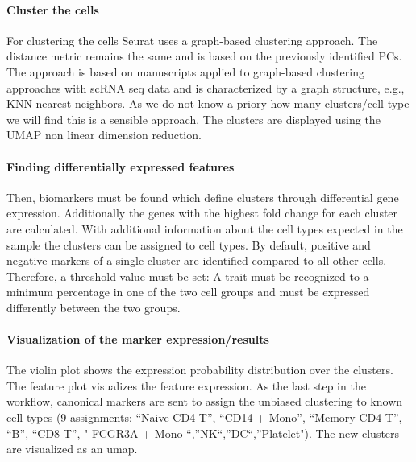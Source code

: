 \documentclass[a4paper, 10pt]{scrartcl}
\begin{document}
\hypertarget{cluster-the-cells}{%
\paragraph{Cluster the cells}\label{cluster-the-cells}}

For clustering the cells Seurat uses a graph-based clustering approach.
The distance metric remains the same and is based on the previously
identified PCs. The approach is based on manuscripts applied to
graph-based clustering approaches with scRNA seq data and is
characterized by a graph structure, e.g., KNN nearest neighbors. As we
do not know a priory how many clusters/cell type we will find this is a
sensible approach. The clusters are displayed using the UMAP non linear
dimension reduction.

\hypertarget{finding-differentially-expressed-features}{%
\paragraph{Finding differentially expressed
features}\label{finding-differentially-expressed-features}}

Then, biomarkers must be found which define clusters through
differential gene expression. Additionally the genes with the highest
fold change for each cluster are calculated. With additional information
about the cell types expected in the sample the clusters can be assigned
to cell types. By default, positive and negative markers of a single
cluster are identified compared to all other cells. Therefore, a
threshold value must be set: A trait must be recognized to a minimum
percentage in one of the two cell groups and must be expressed
differently between the two groups.

\hypertarget{visualization-of-the-marker-expressionresults}{%
\paragraph{Visualization of the marker
expression/results}\label{visualization-of-the-marker-expressionresults}}

The violin plot shows the expression probability distribution over the
clusters. The feature plot visualizes the feature expression. As the
last step in the workflow, canonical markers are sent to assign the
unbiased clustering to known cell types (9 assignments: ``Naive CD4 T'',
``CD14 + Mono'', ``Memory CD4 T'', ``B'', ``CD8 T'', " FCGR3A + Mono
``,''NK``,''DC``,''Platelet"). The new clusters are visualized as an
umap.
\end{document}
